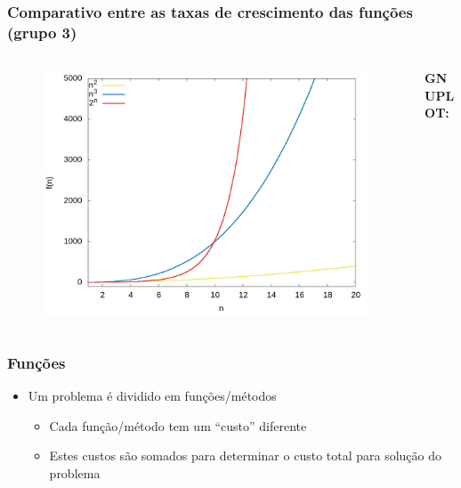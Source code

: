 \documentclass[aspectratio=169]{beamer}
\begin{document}
\begin{frame}\frametitle{Comparativo entre as taxas de crescimento das funções (grupo 3)}
\vspace{-5mm}
\begin{columns}[T]
\begin{column}{0.5\linewidth}
\begin{figure}[h]
	\centering
	\includegraphics[height=0.65\paperheight]{graficos/grupo3.jpg}
\end{figure}
\end{column}
\begin{column}{0.5\linewidth}
\vspace{5mm}
{\fontsize{0}{4}\selectfont{}\textbf{GNUPLOT:}

}
\end{column}
\end{columns}
\end{frame}

\begin{frame}\frametitle{Funções}
\begin{itemize}
	\item Um problema é dividido em funções/métodos
	\begin{itemize}
		\item Cada função/método tem um ``custo'' diferente
		\item Estes custos são somados para determinar o custo total para solução do problema
	\end{itemize}
\end{itemize}
\end{frame}
\end{document}
